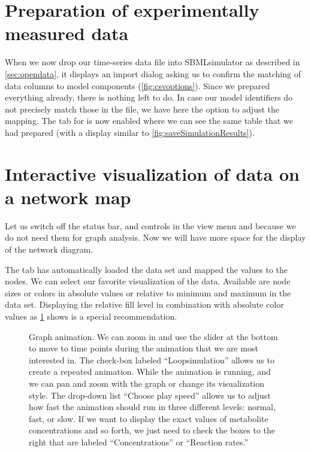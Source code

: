 \section{Preparation of experimentally measured data}

When we now drop our time-series data file into SBMLsimulator as described in \cref{sec:opendata}, it displays an import dialog asking us to confirm the matching of data columns to model components (\cref{fig:csvoptions}).
Since we prepared everything already, there is nothing left to do.
In case our model identifiers do not precisely match those in the \CSV file, we have here the option to adjust the mapping.
The tab for  is now enabled where we can see the same table that we had prepared (with a display similar to \cref{fig:saveSimulationResults}).

\section{Interactive visualization of data on a network map}

Let us switch off the status bar, and controls in the view menu  and  because we do not need them for graph analysis.
Now we will have more space for the display of the network diagram.

The  tab has automatically loaded the data set and mapped the values to the nodes. 
We can select our favorite visualization of the data.
Available are node sizes or colors in absolute values or relative to minimum and maximum in the data set.
Displaying the relative fill level in combination with absolute color values as \cref{fig:GraphAnimation} shows is a special recommendation.
\begin{figure}[htb]
  \caption[Graph animation]{Graph animation.
  We can zoom in and use the slider at the bottom to move to time points during the animation that we are most interested in.
  The check-box labeled ``Loopsimulation'' allows us to create a repeated animation.
  While the animation is running, and we can pan and zoom with the graph or change its visualization style.
  The drop-down list ``Choose play speed'' allows us to adjust how fast the animation should run in three different levels: normal, fast, or slow.
If we want to display the exact values of metabolite concentrations and so forth, we just need to check the boxes to the right that are labeled ``Concentrations'' or ``Reaction rates.''}
  \label{fig:GraphAnimation}
\end{figure}

